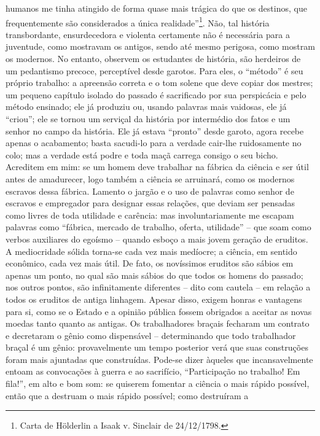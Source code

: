 humanos me tinha atingido de forma quase mais trágica do que os
destinos, que frequentemente são considerados a única
realidade''\footnote{Carta de Hölderlin a Isaak v. Sinclair de 24/12/1798.}.
Não, tal história transbordante, ensurdecedora e violenta certamente não
é necessária para a juventude, como mostravam os antigos, sendo até
mesmo perigosa, como mostram os modernos. No entanto, observem os
estudantes de história, são herdeiros de um pedantismo precoce,
perceptível desde garotos. Para eles, o ``método'' é seu próprio
trabalho: a apreensão correta e o tom solene que deve copiar dos
mestres; um pequeno capítulo isolado do passado é sacrificado por sua
perspicácia e pelo método ensinado; ele já produziu ou, usando palavras
mais vaidosas, ele já ``criou''; ele se tornou um serviçal da história
por intermédio dos fatos e um senhor no campo da história. Ele já estava
``pronto'' desde garoto, agora recebe apenas o acabamento; basta
sacudi-lo para a verdade cair-lhe ruidosamente no colo; mas a verdade
está podre e toda maçã carrega consigo o seu bicho. Acreditem em mim: se
um homem deve trabalhar na fábrica da ciência e ser útil antes de
amadurecer, logo também a ciência se arruinará, como os modernos
escravos dessa fábrica. Lamento o jargão e o uso de palavras como senhor
de escravos e empregador para designar essas relações, que deviam ser
pensadas como livres de toda utilidade e carência: mas involuntariamente
me escapam palavras como ``fábrica, mercado de trabalho, oferta,
utilidade'' -- que soam como verbos auxiliares do egoísmo -- quando
esboço a mais jovem geração de eruditos. A mediocridade sólida torna-se
cada vez mais medíocre; a ciência, em sentido econômico, cada vez mais
útil. De fato, os novíssimos eruditos são sábios em apenas um ponto, no
qual são mais sábios do que todos os homens do passado; nos outros
pontos, são infinitamente diferentes -- dito com cautela -- em relação a
todos os eruditos de antiga linhagem. Apesar disso, exigem honras e
vantagens para si, como se o Estado e a opinião pública fossem obrigados
a aceitar as novas moedas tanto quanto as antigas. Os trabalhadores
braçais fecharam um contrato e decretaram o gênio como dispensável --
determinando que todo trabalhador braçal é um gênio: provavelmente um
tempo posterior verá que suas construções foram mais ajuntadas que
construídas. Pode-se dizer àqueles que incansavelmente entoam as
convocações à guerra e ao sacrifício, ``Participação no trabalho! Em
fila!'', em alto e bom som: se quiserem fomentar a ciência o mais rápido
possível, então que a destruam o mais rápido possível; como destruíram a
